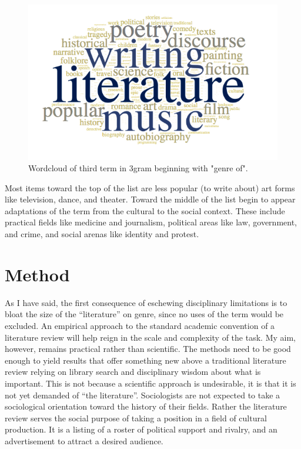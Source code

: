 \documentclass[]{book}
\theoremstyle{definition}
\theoremstyle{definition}
\theoremstyle{definition}
\theoremstyle{remark}
\begin{document}
\begin{figure}

{\centering \includegraphics[width=0.9\linewidth]{img/genre-goog} 

}

\caption{Wordcloud of third term in 3gram beginning with "genre of".}\label{fig:genre-goog}
\end{figure}

Most items toward the top of the list are less popular (to write about)
art forms like television, dance, and theater. Toward the middle of the
list begin to appear adaptations of the term from the cultural to the
social context. These include practical fields like medicine and
journalism, political areas like law, government, and crime, and social
arenas like identity and protest.

\hypertarget{method}{%
\section{Method}\label{method}}

As I have said, the first consequence of eschewing disciplinary
limitations is to bloat the size of the ``literature'' on genre, since
no uses of the term would be excluded. An empirical approach to the
standard academic convention of a literature review will help reign in
the scale and complexity of the task. My aim, however, remains practical
rather than scientific. The methods need to be good enough to yield
results that offer something new above a traditional literature review
relying on library search and disciplinary wisdom about what is
important. This is not because a scientific approach is undesirable, it
is that it is not yet demanded of ``the literature''. Sociologists are
not expected to take a sociological orientation toward the history of
their fields. Rather the literature review serves the social purpose of
taking a position in a field of cultural production. It is a listing of
a roster of political support and rivalry, and an advertisement to
attract a desired audience.
\end{document}
